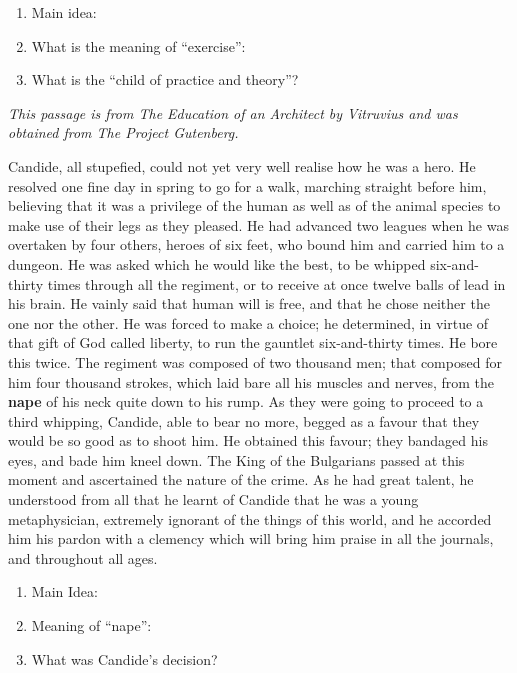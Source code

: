 \begin{enumerate}
\item Main idea: \hrulefill
\item What is the meaning of ``exercise'': \hrulefill
\item What is the ``child of practice and theory''? \hrulefill
\end{enumerate}

\textit{This passage is from The Education of an Architect by Vitruvius and was obtained from The Project Gutenberg.}

\bigskip
\begin{linenumbers*}
\modulolinenumbers[5]
\indent Candide, all stupefied, could not yet very well realise how he was a hero. He resolved one fine day in spring to go for a walk, marching straight before him, believing that it was a privilege of the human as well as of the animal species to make use of their legs as they pleased. He had advanced two leagues when he was overtaken by four others, heroes of six feet, who bound him and carried him to a dungeon. He was asked which he would like the best, to be whipped six-and-thirty times through all the regiment, or to receive at once twelve balls of lead in his brain. He vainly said that human will is free, and that he chose neither the one nor the other. He was forced to make a choice; he determined, in virtue of that gift of God called liberty, to run the gauntlet six-and-thirty times. He bore this twice. The regiment was composed of two thousand men; that composed for him four thousand strokes, which laid bare all his muscles and nerves, from the \textbf{nape} of his neck quite down to his rump. As they were going to proceed to a third whipping, Candide, able to bear no more, begged as a favour that they would be so good as to shoot him. He obtained this favour; they bandaged his eyes, and bade him kneel down. The King of the Bulgarians passed at this moment and ascertained the nature of the crime. As he had great talent, he understood from all that he learnt of Candide that he was a young metaphysician, extremely ignorant of the things of this world, and he accorded him his pardon with a clemency which will bring him praise in all the journals, and throughout all ages.
\end{linenumbers*}

\begin{enumerate}
\item Main Idea: \hrulefill
\item Meaning of ``nape'': \hrulefill
\item What was Candide's decision? \hrulefill
\end{enumerate}

